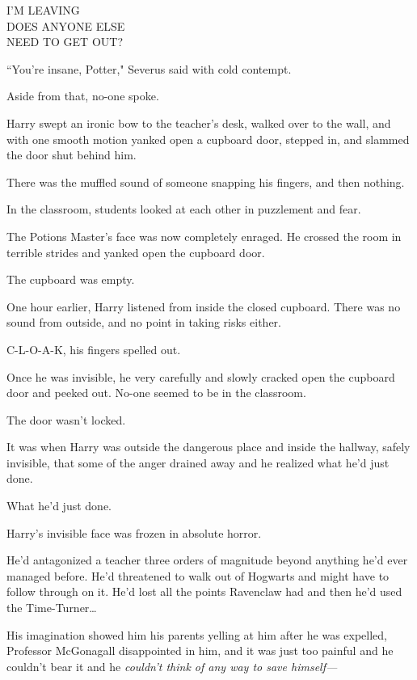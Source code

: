 \begin{writtenNote}
I'M LEAVING\\
DOES ANYONE ELSE\\
NEED TO GET OUT?
\end{writtenNote}

``You're insane, Potter," Severus said with cold contempt.

Aside from that, no-one spoke.

Harry swept an ironic bow to the teacher's desk, walked over to the wall, and with one smooth motion yanked open a cupboard door, stepped in, and slammed the door shut behind him.

There was the muffled sound of someone snapping his fingers, and then nothing.

In the classroom, students looked at each other in puzzlement and fear.

The Potions Master's face was now completely enraged. He crossed the room in terrible strides and yanked open the cupboard door.

The cupboard was empty.

\later

One hour earlier, Harry listened from inside the closed cupboard. There was no sound from outside, and no point in taking risks either.

C-L-O-A-K, his fingers spelled out.

Once he was invisible, he very carefully and slowly cracked open the cupboard door and peeked out. No-one seemed to be in the classroom.

The door wasn't locked.

It was when Harry was outside the dangerous place and inside the hallway, safely invisible, that some of the anger drained away and he realized what he'd just done.

What he'd just done.

Harry's invisible face was frozen in absolute horror.

He'd antagonized a teacher three orders of magnitude beyond anything he'd ever managed before. He'd threatened to walk out of Hogwarts and might have to follow through on it. He'd lost all the points Ravenclaw had and then he'd used the Time-Turner…

His imagination showed him his parents yelling at him after he was expelled, Professor McGonagall disappointed in him, and it was just too painful and he couldn't bear it and he \emph{couldn't think of any way to save himself—}

